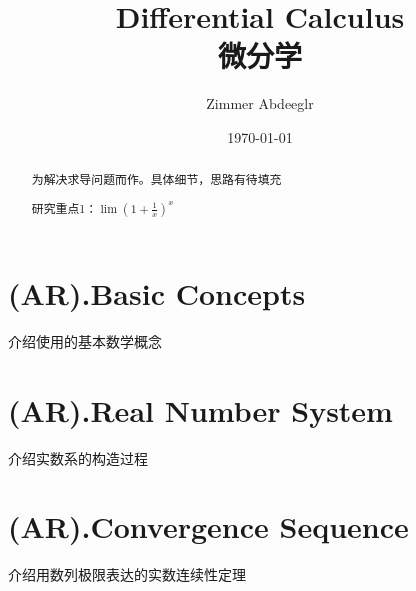 \documentclass{article}
\title{Differential Calculus\\微分学}
\author{Zimmer Abdeeglr}
\date{\today}
\begin{document}
\maketitle
\begin{abstract}
    为解决求导问题而作。具体细节，思路有待填充

    研究重点1：$\lim (1+\frac1x)^x$
\end{abstract}

\newpage










\section{(AR).Basic Concepts}
\noindent 介绍使用的基本数学概念

\newpage






















\section{(AR).Real Number System}
\noindent 介绍实数系的构造过程

\newpage













\section{(AR).Convergence Sequence}
\noindent 介绍用数列极限表达的实数连续性定理


\newpage
\end{document}
